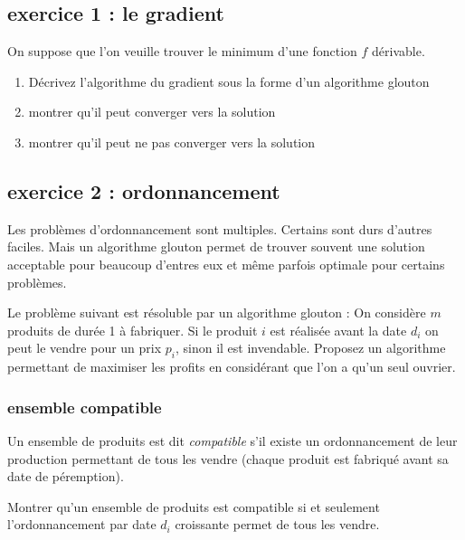 \documentclass[
]{article}
\providecommand{\tightlist}{%
  \setlength{\itemsep}{0pt}\setlength{\parskip}{0pt}}
\begin{document}
\hypertarget{exercice-1-le-gradient}{%
\subsection{exercice 1 : le gradient}\label{exercice-1-le-gradient}}

On suppose que l'on veuille trouver le minimum d'une fonction \(f\)
dérivable.

\begin{enumerate}
\def\labelenumi{\arabic{enumi}.}
\tightlist
\item
  Décrivez l'algorithme du gradient sous la forme d'un algorithme
  glouton
\item
  montrer qu'il peut converger vers la solution
\item
  montrer qu'il peut ne pas converger vers la solution
\end{enumerate}

\hypertarget{exercice-2-ordonnancement}{%
\subsection{exercice 2 :
ordonnancement}\label{exercice-2-ordonnancement}}

Les problèmes d'ordonnancement sont multiples. Certains sont durs
d'autres faciles. Mais un algorithme glouton permet de trouver souvent
une solution acceptable pour beaucoup d'entres eux et même parfois
optimale pour certains problèmes.

Le problème suivant est résoluble par un algorithme glouton : On
considère \(m\) produits de durée 1 à fabriquer. Si le produit \(i\) est
réalisée avant la date \(d_i\) on peut le vendre pour un prix \(p_i\),
sinon il est invendable. Proposez un algorithme permettant de maximiser
les profits en considérant que l'on a qu'un seul ouvrier.

\hypertarget{ensemble-compatible}{%
\subsubsection{ensemble compatible}\label{ensemble-compatible}}

Un ensemble de produits est dit \emph{compatible} s'il existe un
ordonnancement de leur production permettant de tous les vendre (chaque
produit est fabriqué avant sa date de péremption).

Montrer qu'un ensemble de produits est compatible si et seulement
l'ordonnancement par date \(d_i\) croissante permet de tous les vendre.
\end{document}
